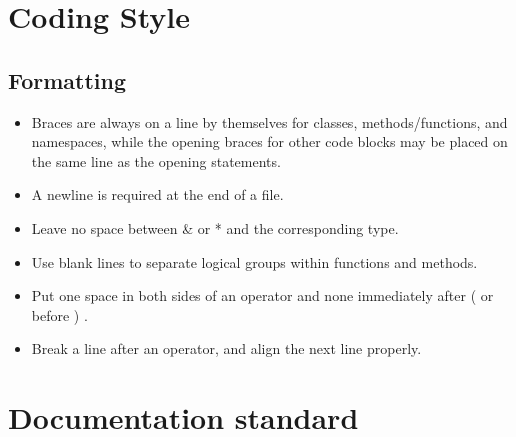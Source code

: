\documentclass[a4paper,twoside,openright,makeidx,12pt]{report}
\begin{document}

\chapter{Coding Style}

\section{Formatting}

\begin{itemize}
\item Braces are always on a line by themselves for classes, methods/functions, and namespaces, while the opening braces for other code 	blocks may be placed on the same line as the opening statements.
\item A newline is required at the end of a file. 
\item Leave no space between  \&  or  *  and the corresponding type.
\item Use blank lines to separate logical groups within functions and methods.
\item Put one space in both sides of an operator and none immediately after  (  or before  ) .
\item Break a line after an operator, and align the next line properly.
\end{itemize}



\chapter{Documentation standard}

\end{document}
